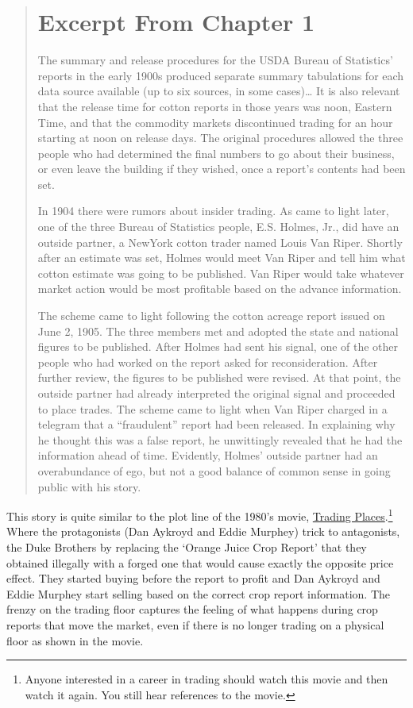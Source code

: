 \documentclass[
]{book}
\begin{document}
\begin{quote}
\hypertarget{excerpt-from-chapter-1}{%
\section{Excerpt From Chapter 1}\label{excerpt-from-chapter-1}}

The summary and release procedures for the USDA Bureau of Statistics' reports in the early 1900s produced separate summary tabulations for each data source available (up to six sources, in some cases)\ldots{} It is also relevant that the release time for cotton reports in those years was noon, Eastern Time, and that the commodity markets discontinued trading for an hour starting at noon on release days. The original procedures allowed the three people who had determined the final numbers to go about their business, or even leave the building if they wished, once a report's contents had been set.

In 1904 there were rumors about insider trading. As came to light later, one of the three Bureau of Statistics people, E.S. Holmes, Jr., did have an outside partner, a NewYork cotton trader named Louis Van Riper. Shortly after an estimate was set, Holmes would meet Van Riper and tell him what cotton estimate was going to be published. Van Riper would take whatever market action would be most profitable based on the advance information.

The scheme came to light following the cotton acreage report issued on June 2, 1905. The three members met and adopted the state and national figures to be published. After Holmes had sent his signal, one of the other people who had worked on the report asked for reconsideration. After further review, the figures to be published were revised. At that point, the outside partner had already interpreted the original signal and proceeded to place trades. The scheme came to light when Van Riper charged in a telegram that a ``fraudulent'' report had been released. In explaining why he thought this was a false report, he unwittingly revealed that he had the information ahead of time. Evidently, Holmes' outside partner had an overabundance of ego, but not a good balance of common sense in going public with his story. \citep{allen_safeguarding_2007}
\end{quote}

This story is quite similar to the plot line of the 1980's movie, \href{http://www.imdb.com/title/tt0086465/}{Trading Places}.\footnote{Anyone interested in a career in trading should watch this movie and then watch it again. You still hear references to the movie.} Where the protagonists (Dan Aykroyd and Eddie Murphey) trick to antagonists, the Duke Brothers by replacing the `Orange Juice Crop Report' that they obtained illegally with a forged one that would cause exactly the opposite price effect. They started buying before the report to profit and Dan Aykroyd and Eddie Murphey start selling based on the correct crop report information. The frenzy on the trading floor captures the feeling of what happens during crop reports that move the market, even if there is no longer trading on a physical floor as shown in the movie.
\end{document}
